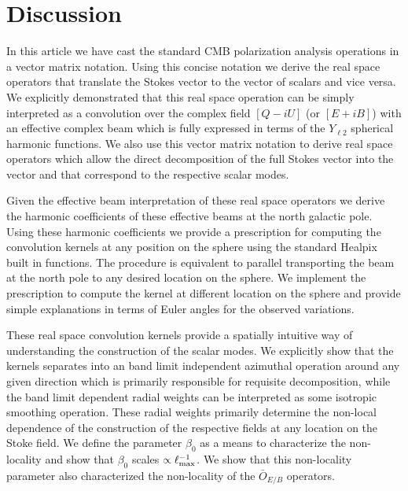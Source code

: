 \section{Discussion}\label{sec:discussion}

 

In this article we have cast the standard CMB polarization analysis operations in a vector matrix notation. Using this concise notation we derive the real space operators that translate the Stokes vector \vp{} to  the vector of scalars \vs and vice versa. We explicitly demonstrated that this real space operation can be simply interpreted as a convolution over the complex field $[Q - i U]$ (or $[E + iB]$) with an effective complex beam which is fully expressed in terms of the $Y_{\ell 2}$ spherical harmonic functions. We also use this vector matrix notation to derive real space operators which allow the direct decomposition of the full Stokes vector \vp{} into the vector  and  that correspond to the respective scalar modes. 

Given the effective beam interpretation of these real space operators we derive the harmonic coefficients of these effective beams at the north galactic pole. Using these harmonic coefficients we provide a prescription for computing the convolution kernels at any position on the sphere using the standard Healpix built in functions. The procedure is equivalent to parallel transporting the beam at the north pole to any desired location on the sphere. We implement the prescription to compute the  kernel at different location on the sphere and provide simple explanations in terms of Euler angles for the observed variations.

These real space convolution kernels provide a spatially intuitive way of understanding the construction of the scalar modes. We explicitly show that the kernels separates into an band limit independent azimuthal operation around any given direction which is primarily responsible for requisite decomposition, while the band limit dependent radial weights can be interpreted as some isotropic smoothing operation. These radial weights primarily determine the non-local dependence of the construction of the respective fields at any location on the Stoke field. We define the parameter $\beta_0$ as a means to characterize the non-locality and show that $\beta_0$ scales $\propto \ell_{\rm max}^{-1}$. We show that this non-locality parameter also characterized the non-locality of the $\bar{O}_{E/B}$ operators. 

